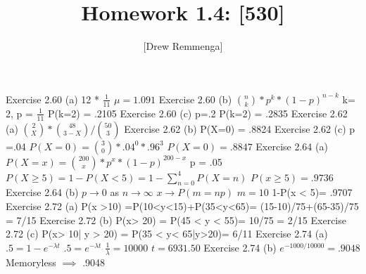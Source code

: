 \documentclass[10pt, oneside]{article}
\title{Homework 1.4: [530]}
\author{[Drew Remmenga]}
\begin{document}
\maketitle
\pagebreak
Exercise 2.60  (a)
12 * $\frac{1}{11}$
$\mu = 1.091$
\clearpage
Exercise 2.60 (b)
${n \choose k} * p^{k} * (1-p)^{n-k}$
k= 2, p = $\frac{1}{11}$
P(k=2) = .2105
\clearpage
Exercise 2.60 (c)
p=.2
P(k=2) = .2835
\clearpage
Exercise 2.62 (a)
${2 \choose X}*{48 \choose 3-X} / {50 \choose 3}$
\clearpage
Exercise 2.62 (b)
P(X=0) = .8824
\clearpage
Exercise 2.62 (c)
p =.04
$P(X=0) = {3 \choose 0} * .04^{0} * .96^{3}$
$P(X=0) = .8847$
\clearpage
Exercise 2.64 (a)
$P(X=x)= {200 \choose x} * p^{x} * (1-p)^{200-x}$
p = .05
$P(X\geq 5)=1-P(X < 5) = 1-\sum_{n=0}^{4} P(X=n)$
$P(x\geq5)=.9736$
\clearpage
Exercise 2.64 (b)
$p \to 0$ as $n \to \infty$ $x \to P(m=np)$ $m=10$
1-P(x < 5)= .9707
\clearpage
Exercise 2.72 (a)
P(x >10) =P(10<y<15)+P(35<y<65)= (15-10)/75+(65-35)/75 = 7/15
\clearpage
Exercise 2.72 (b)
P(x> 20) = P(45 < y < 55)= 10/75 = 2/15
\clearpage
Exercise 2.72 (c) 
P(x> 10| y > 20) = P(35 < y< 65|y>20)= 6/11 
\clearpage
Exercise 2.74 (a)
$.5 = 1 - e^{-\lambda t}$
$.5 = e^{-\lambda t}$
$\frac{1}{\lambda} = 10000$
$t = 6931.50$
\clearpage
Exercise 2.74 (b)
$e^{-1000/10000} = .9048$
\clearpage
Memoryless $\implies$ .9048
\end{document}
